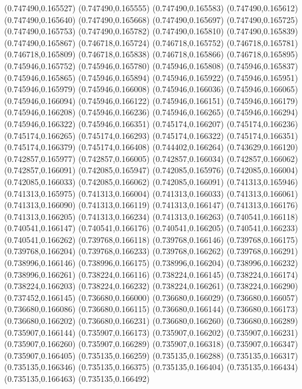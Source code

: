 (0.747490,0.165527)
(0.747490,0.165555)
(0.747490,0.165583)
(0.747490,0.165612)
(0.747490,0.165640)
(0.747490,0.165668)
(0.747490,0.165697)
(0.747490,0.165725)
(0.747490,0.165753)
(0.747490,0.165782)
(0.747490,0.165810)
(0.747490,0.165839)
(0.747490,0.165867)
(0.746718,0.165724)
(0.746718,0.165752)
(0.746718,0.165781)
(0.746718,0.165809)
(0.746718,0.165838)
(0.746718,0.165866)
(0.746718,0.165895)
(0.745946,0.165752)
(0.745946,0.165780)
(0.745946,0.165808)
(0.745946,0.165837)
(0.745946,0.165865)
(0.745946,0.165894)
(0.745946,0.165922)
(0.745946,0.165951)
(0.745946,0.165979)
(0.745946,0.166008)
(0.745946,0.166036)
(0.745946,0.166065)
(0.745946,0.166094)
(0.745946,0.166122)
(0.745946,0.166151)
(0.745946,0.166179)
(0.745946,0.166208)
(0.745946,0.166236)
(0.745946,0.166265)
(0.745946,0.166294)
(0.745946,0.166322)
(0.745946,0.166351)
(0.745174,0.166207)
(0.745174,0.166236)
(0.745174,0.166265)
(0.745174,0.166293)
(0.745174,0.166322)
(0.745174,0.166351)
(0.745174,0.166379)
(0.745174,0.166408)
(0.744402,0.166264)
(0.743629,0.166120)
(0.742857,0.165977)
(0.742857,0.166005)
(0.742857,0.166034)
(0.742857,0.166062)
(0.742857,0.166091)
(0.742085,0.165947)
(0.742085,0.165976)
(0.742085,0.166004)
(0.742085,0.166033)
(0.742085,0.166062)
(0.742085,0.166091)
(0.741313,0.165946)
(0.741313,0.165975)
(0.741313,0.166004)
(0.741313,0.166033)
(0.741313,0.166061)
(0.741313,0.166090)
(0.741313,0.166119)
(0.741313,0.166147)
(0.741313,0.166176)
(0.741313,0.166205)
(0.741313,0.166234)
(0.741313,0.166263)
(0.740541,0.166118)
(0.740541,0.166147)
(0.740541,0.166176)
(0.740541,0.166205)
(0.740541,0.166233)
(0.740541,0.166262)
(0.739768,0.166118)
(0.739768,0.166146)
(0.739768,0.166175)
(0.739768,0.166204)
(0.739768,0.166233)
(0.739768,0.166262)
(0.739768,0.166291)
(0.738996,0.166146)
(0.738996,0.166175)
(0.738996,0.166204)
(0.738996,0.166232)
(0.738996,0.166261)
(0.738224,0.166116)
(0.738224,0.166145)
(0.738224,0.166174)
(0.738224,0.166203)
(0.738224,0.166232)
(0.738224,0.166261)
(0.738224,0.166290)
(0.737452,0.166145)
(0.736680,0.166000)
(0.736680,0.166029)
(0.736680,0.166057)
(0.736680,0.166086)
(0.736680,0.166115)
(0.736680,0.166144)
(0.736680,0.166173)
(0.736680,0.166202)
(0.736680,0.166231)
(0.736680,0.166260)
(0.736680,0.166289)
(0.735907,0.166144)
(0.735907,0.166173)
(0.735907,0.166202)
(0.735907,0.166231)
(0.735907,0.166260)
(0.735907,0.166289)
(0.735907,0.166318)
(0.735907,0.166347)
(0.735907,0.166405)
(0.735135,0.166259)
(0.735135,0.166288)
(0.735135,0.166317)
(0.735135,0.166346)
(0.735135,0.166375)
(0.735135,0.166404)
(0.735135,0.166434)
(0.735135,0.166463)
(0.735135,0.166492)
